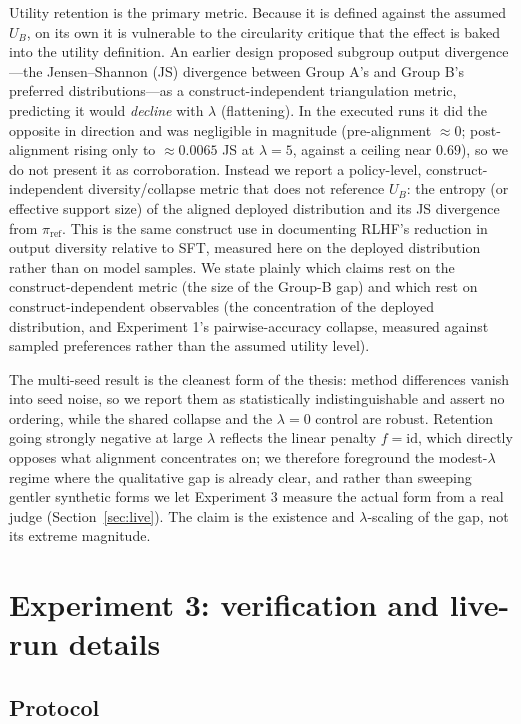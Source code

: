 ﻿\documentclass[11pt]{article}
\begin{document}
Utility retention is the primary metric. Because it is defined against the assumed \(U_B\), on its own it is vulnerable to the circularity critique that the effect is baked into the utility definition. An earlier design proposed subgroup output divergence---the Jensen--Shannon (JS) divergence between Group A's and Group B's preferred distributions---as a construct-independent triangulation metric, predicting it would \emph{decline} with \(\lambda\) (flattening). In the executed runs it did the opposite in direction and was negligible in magnitude (pre-alignment \(\approx 0\); post-alignment rising only to \(\approx 0.0065\) JS at \(\lambda = 5\), against a ceiling near \(0.69\)), so we do not present it as corroboration. Instead we report a policy-level, construct-independent diversity/collapse metric that does not reference \(U_B\): the entropy (or effective support size) of the aligned deployed distribution and its JS divergence from \(\pi_{\text{ref}}\). This is the same construct \citet{kirk2024} use in documenting RLHF's reduction in output diversity relative to SFT, measured here on the deployed distribution rather than on model samples. We state plainly which claims rest on the construct-dependent metric (the size of the Group-B gap) and which rest on construct-independent observables (the concentration of the deployed distribution, and Experiment 1's pairwise-accuracy collapse, measured against sampled preferences rather than the assumed utility level).

The multi-seed result is the cleanest form of the thesis: method differences vanish into seed noise, so we report them as statistically indistinguishable and assert no ordering, while the shared collapse and the \(\lambda = 0\) control are robust. Retention going strongly negative at large \(\lambda\) reflects the linear penalty \(f = \mathrm{id}\), which directly opposes what alignment concentrates on; we therefore foreground the modest-\(\lambda\) regime where the qualitative gap is already clear, and rather than sweeping gentler synthetic forms we let Experiment 3 measure the actual form from a real judge (Section~\ref{sec:live}). The claim is the existence and \(\lambda\)-scaling of the gap, not its extreme magnitude.


\section{Experiment 3: verification and live-run details}
\label{app:synth}

\subsection{Protocol}
\label{app:exp3-protocol}
\end{document}
